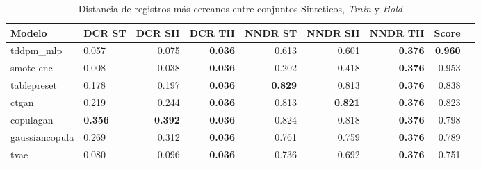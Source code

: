 \begin{table}[H]
\centering
\caption{Distancia de registros más cercanos entre conjuntos Sinteticos, \emph{Train} y \emph{Hold}}
\label{table-dcr-king county-a}
\begin{tabular}{|l|l|r|r|r|r|r|r|r|}
\hline
\rowcolor[gray]{0.8}
Modelo & DCR ST & DCR SH & DCR TH & NNDR ST & NNDR SH & NNDR TH & \textbf{Score} \\
\hline tddpm\_mlp & 0.057 & 0.075 & \bfseries 0.036 & 0.613 & 0.601 & \bfseries 0.376 & \bfseries 0.960 \\
\hline smote-enc & \cellcolor[rgb]{0.9, 0.54, 0.52} 0.008 & \cellcolor[rgb]{0.9, 0.54, 0.52} 0.038 & \bfseries 0.036 & 0.202 & 0.418 & \bfseries 0.376 & 0.953 \\
\hline tablepreset & 0.178 & 0.197 & \bfseries 0.036 & \bfseries 0.829 & 0.813 & \bfseries 0.376 & 0.838 \\
\hline ctgan & 0.219 & 0.244 & \bfseries 0.036 & 0.813 & \bfseries 0.821 & \bfseries 0.376 & 0.823 \\
\hline copulagan & \bfseries 0.356 & \bfseries 0.392 & \bfseries 0.036 & 0.824 & 0.818 & \bfseries 0.376 & 0.798 \\
\hline gaussiancopula & 0.269 & 0.312 & \bfseries 0.036 & 0.761 & 0.759 & \bfseries 0.376 & 0.789 \\
\hline tvae & 0.080 & 0.096 & \bfseries 0.036 & 0.736 & 0.692 & \bfseries 0.376 & 0.751 \\
\hline
\end{tabular}
\end{table}

